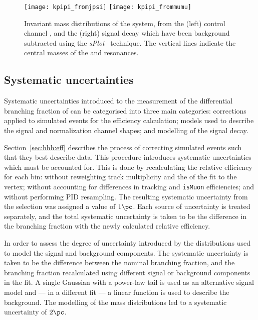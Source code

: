 \begin{figure}
  \begin{center}
    \texttt{[image: kpipi\_fromjpsi]}
    \texttt{[image: kpipi\_frommumu]}
    \caption[Invariant mass distributions of \kpipi in data]
    {
      Invariant mass distributions of the \kpipi system, from the
      (left) control channel \btojpsikpipi, and the
      (right) signal decay \btokpipimumu
      which have been background subtracted
      using the \emph{sPlot}~\cite{splot} technique.
      The vertical lines indicate the central masses of the  and 
      resonances.
    }
    \label{fig:kpipi:kpipi}
  \end{center}
\end{figure}



\subsection{Systematic uncertainties}
\label{ssec:kpipi:syst}

Systematic uncertainties introduced to the measurement of the differential branching fraction of
\btokpipimumu can be categorised into three main categories:
corrections applied to simulated events for the efficiency calculation;
models used to describe the signal and normalization channel shapes; and
modelling of the signal decay.

Section~\ref{sec:hhh:eff} describes the process of correcting simulated events such that they best
describe data.
This procedure introduces systematic uncertainties which must be accounted for.
This is done by recalculating the relative efficiency for each \qsq bin:
without reweighting track multiplicity and the \chisq of the fit to the \Bp vertex;
without accounting for differences in tracking and {\tt isMuon} efficiencies;
and without performing PID resampling.
The resulting systematic uncertainty from the selection was assigned a value of $1\pc$.
Each source of uncertainty is treated separately, and the total systematic uncertainty is taken to
be the difference in the branching fraction with the newly calculated relative efficiency.

In order to assess the degree of uncertainty introduced by the distributions used to model the
signal and background components.
The systematic uncertainty is taken to be the difference between the nominal branching fraction,
and the branching fraction recalculated using different signal or background components in the fit.
A single Gaussian with a power-law tail is used as an alternative signal model and --- in a
different fit --- a linear function is used to describe the background.
The modelling of the mass distributions led to a systematic uncertainty of $2\pc$.

